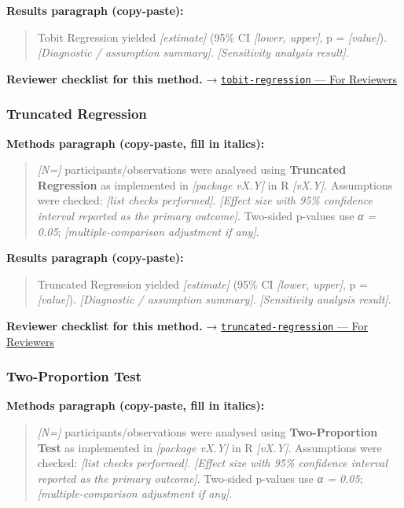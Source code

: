 \documentclass[
]{article}
\begin{document}
\textbf{Results paragraph (copy-paste):}

\begin{quote}
Tobit Regression yielded \emph{{[}estimate{]}} (95\% CI \emph{{[}lower,
upper{]}}, p = \emph{{[}value{]}}). \emph{{[}Diagnostic / assumption
summary{]}}. \emph{{[}Sensitivity analysis result{]}}.
\end{quote}

\textbf{Reviewer checklist for this method.} →
\href{../chapters/07-regression/tobit-regression.Rmd\#for-reviewers}{\texttt{tobit-regression}
--- For Reviewers}

\subsubsection{Truncated Regression}\label{truncated-regression}

\textbf{Methods paragraph (copy-paste, fill in italics):}

\begin{quote}
\emph{{[}N={]}} participants/observations were analysed using
\textbf{Truncated Regression} as implemented in \emph{{[}package
vX.Y{]}} in R \emph{{[}vX.Y{]}}. Assumptions were checked: \emph{{[}list
checks performed{]}}. \emph{{[}Effect size with 95\% confidence interval
reported as the primary outcome{]}}. Two-sided p-values use \emph{α =
0.05}; \emph{{[}multiple-comparison adjustment if any{]}}.
\end{quote}

\textbf{Results paragraph (copy-paste):}

\begin{quote}
Truncated Regression yielded \emph{{[}estimate{]}} (95\% CI
\emph{{[}lower, upper{]}}, p = \emph{{[}value{]}}). \emph{{[}Diagnostic
/ assumption summary{]}}. \emph{{[}Sensitivity analysis result{]}}.
\end{quote}

\textbf{Reviewer checklist for this method.} →
\href{../chapters/07-regression/truncated-regression.Rmd\#for-reviewers}{\texttt{truncated-regression}
--- For Reviewers}

\subsubsection{Two-Proportion Test}\label{two-proportion-test}

\textbf{Methods paragraph (copy-paste, fill in italics):}

\begin{quote}
\emph{{[}N={]}} participants/observations were analysed using
\textbf{Two-Proportion Test} as implemented in \emph{{[}package vX.Y{]}}
in R \emph{{[}vX.Y{]}}. Assumptions were checked: \emph{{[}list checks
performed{]}}. \emph{{[}Effect size with 95\% confidence interval
reported as the primary outcome{]}}. Two-sided p-values use \emph{α =
0.05}; \emph{{[}multiple-comparison adjustment if any{]}}.
\end{quote}
\end{document}
